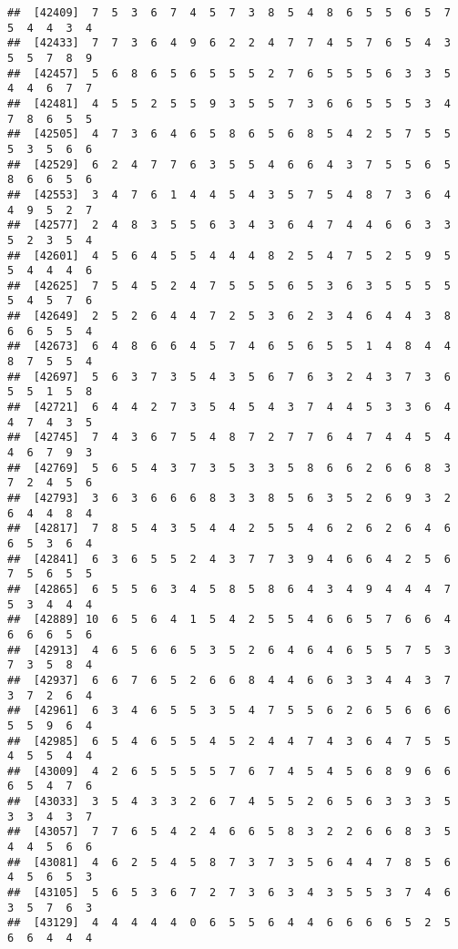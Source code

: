 \documentclass[
]{book}
\begin{document}
\begin{verbatim}
##  [42409]  7  5  3  6  7  4  5  7  3  8  5  4  8  6  5  5  6  5  7  5  4  4  3  4
##  [42433]  7  7  3  6  4  9  6  2  2  4  7  7  4  5  7  6  5  4  3  5  5  7  8  9
##  [42457]  5  6  8  6  5  6  5  5  5  2  7  6  5  5  5  6  3  3  5  4  4  6  7  7
##  [42481]  4  5  5  2  5  5  9  3  5  5  7  3  6  6  5  5  5  3  4  7  8  6  5  5
##  [42505]  4  7  3  6  4  6  5  8  6  5  6  8  5  4  2  5  7  5  5  5  3  5  6  6
##  [42529]  6  2  4  7  7  6  3  5  5  4  6  6  4  3  7  5  5  6  5  8  6  6  5  6
##  [42553]  3  4  7  6  1  4  4  5  4  3  5  7  5  4  8  7  3  6  4  4  9  5  2  7
##  [42577]  2  4  8  3  5  5  6  3  4  3  6  4  7  4  4  6  6  3  3  5  2  3  5  4
##  [42601]  4  5  6  4  5  5  4  4  4  8  2  5  4  7  5  2  5  9  5  5  4  4  4  6
##  [42625]  7  5  4  5  2  4  7  5  5  5  6  5  3  6  3  5  5  5  5  5  4  5  7  6
##  [42649]  2  5  2  6  4  4  7  2  5  3  6  2  3  4  6  4  4  3  8  6  6  5  5  4
##  [42673]  6  4  8  6  6  4  5  7  4  6  5  6  5  5  1  4  8  4  4  8  7  5  5  4
##  [42697]  5  6  3  7  3  5  4  3  5  6  7  6  3  2  4  3  7  3  6  5  5  1  5  8
##  [42721]  6  4  4  2  7  3  5  4  5  4  3  7  4  4  5  3  3  6  4  4  7  4  3  5
##  [42745]  7  4  3  6  7  5  4  8  7  2  7  7  6  4  7  4  4  5  4  4  6  7  9  3
##  [42769]  5  6  5  4  3  7  3  5  3  3  5  8  6  6  2  6  6  8  3  7  2  4  5  6
##  [42793]  3  6  3  6  6  6  8  3  3  8  5  6  3  5  2  6  9  3  2  6  4  4  8  4
##  [42817]  7  8  5  4  3  5  4  4  2  5  5  4  6  2  6  2  6  4  6  6  5  3  6  4
##  [42841]  6  3  6  5  5  2  4  3  7  7  3  9  4  6  6  4  2  5  6  7  5  6  5  5
##  [42865]  6  5  5  6  3  4  5  8  5  8  6  4  3  4  9  4  4  4  7  5  3  4  4  4
##  [42889] 10  6  5  6  4  1  5  4  2  5  5  4  6  6  5  7  6  6  4  6  6  6  5  6
##  [42913]  4  6  5  6  6  5  3  5  2  6  4  6  4  6  5  5  7  5  3  7  3  5  8  4
##  [42937]  6  6  7  6  5  2  6  6  8  4  4  6  6  3  3  4  4  3  7  3  7  2  6  4
##  [42961]  6  3  4  6  5  5  3  5  4  7  5  5  6  2  6  5  6  6  6  5  5  9  6  4
##  [42985]  6  5  4  6  5  5  4  5  2  4  4  7  4  3  6  4  7  5  5  4  5  5  4  4
##  [43009]  4  2  6  5  5  5  5  7  6  7  4  5  4  5  6  8  9  6  6  6  5  4  7  6
##  [43033]  3  5  4  3  3  2  6  7  4  5  5  2  6  5  6  3  3  3  5  3  3  4  3  7
##  [43057]  7  7  6  5  4  2  4  6  6  5  8  3  2  2  6  6  8  3  5  4  4  5  6  6
##  [43081]  4  6  2  5  4  5  8  7  3  7  3  5  6  4  4  7  8  5  6  4  5  6  5  3
##  [43105]  5  6  5  3  6  7  2  7  3  6  3  4  3  5  5  3  7  4  6  3  5  7  6  3
##  [43129]  4  4  4  4  4  0  6  5  5  6  4  4  6  6  6  6  5  2  5  6  6  4  4  4

\end{verbatim}
\end{document}
